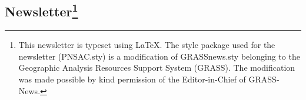 \address{Roger Button, BA. MA. LLB.\\
Director, Corporate Secretary, NStar Chronicle Editor\\\\
}

\address{Paul Labranche\\
Treasurer\\
}

  
\subsection{Newsletter\protect\footnote{This newsletter is typeset using
    \LaTeX.  The style package used for the newsletter (PNSAC.sty) is
    a modification of GRASSnews.sty belonging to the Geographic
    Analysis Resources Support System (GRASS). The modification was
    made possible by kind permission of the Editor-in-Chief of
    GRASS-News.}}


\small\address{Editor: Roger Button\\
\small{}}

\address{Typesetter: Drew Hodge}







